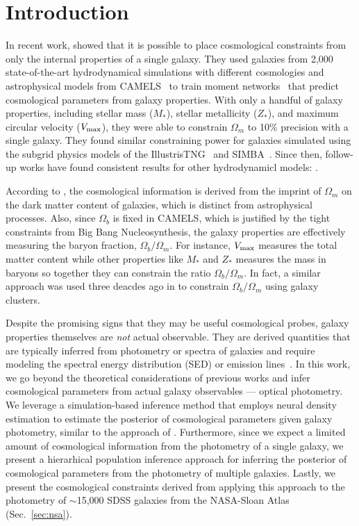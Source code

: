 \section{Introduction} \label{sec:intro} 
In recent work, \cite{villaescusa-navarro2022} showed that it is possible to
place cosmological constraints from only the internal properties of a single
galaxy.  
They used galaxies from 2,000 state-of-the-art hydrodynamical simulations with
different cosmologies and astrophysical models from
CAMELS~\citep{villaescusa-navarro2021, villaescusa-navarro2022a} to train
moment networks~\citep{jeffrey2020a} that predict cosmological parameters from
galaxy properties. 
With only a handful of galaxy properties, including stellar mass ($M_*$),
stellar metallicity ($Z_*$), and maximum circular velocity ($V_{\rm max}$),
they were able to constrain $\Omega_m$ to 10\% precision with a single galaxy.
They found similar constraining power for galaxies simulated using the subgrid
physics models of the IllustrisTNG~\citep{pillepich2018, weinberger2018} and
SIMBA~\citep{dave2019}. 
Since then, follow-up works have found consistent results for other
hydrodynamicl models: \citep{echeverri2023}. 


According to \citep{villaescusa-navarro2021}, the cosmological information is
derived from the imprint of $\Omega_m$ on the dark matter content of galaxies,
which is distinct from astrophysical processes. 
Also, since $\Omega_b$ is fixed in CAMELS, which is justified by the tight
constraints from Big Bang Nucleosynthesis, the galaxy properties are
effectively measuring the baryon fraction, $\Omega_b/\Omega_m$.
For instance, $V_{\rm max}$ measures the total matter content while other
properties like $M_*$ and $Z_*$ measures the mass in baryons so together they
can constrain the ratio $\Omega_b/\Omega_m$.
In fact, a similar approach was used three deacdes ago in \citep{white1993} to
constrain $\Omega_b/\Omega_m$  using galaxy clusters. 

Despite the promising signs that they may be useful cosmological probes, galaxy
properties themselves are {\em not} actual observable.
They are derived quantities that are typically inferred from photometry or
spectra of galaxies and require modeling the spectral energy distribution
(SED) or emission lines~\citep{conroy2013}.
In this work, we go beyond the theoretical considerations of previous works and
infer cosmological parameters from actual galaxy observables --- optical  
photometry.  
We leverage a simulation-based inference method that employs neural density
estimation to estimate the posterior of cosmological parameters given galaxy
photometry, similar to the approach of \cite{hahn2022a}. 
Furthermore, since we expect a limited amount of cosmological information from
the photometry of a single galaxy, we present a hierarhical population
inference approach for inferring the posterior of cosmological parameters
from the photometry of multiple galaxies. 
Lastly, we present the cosmological constraints derived from applying this
approach to the photometry of $\sim$15,000 SDSS galaxies from the NASA-Sloan
Atlas (Sec.~\ref{sec:nsa}). 
